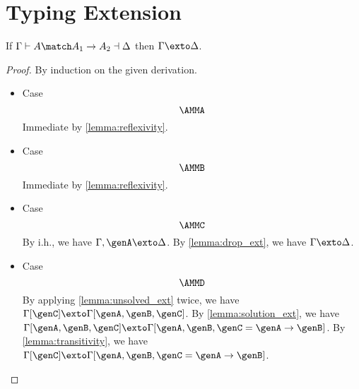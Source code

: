 \section{Typing Extension}

\begin{mlemma}
  If $\Gamma \vdash A \match A_1 \to A_2 \dashv \Delta$ then $\Gamma \exto \Delta$.
  \label{lemma:match_extension}
\end{mlemma}
\begin{proof}
  By induction on the given derivation.
  \begin{itemize}
  \item Case \[\AMMA \] Immediate by \cref{lemma:reflexivity}.
  \item Case \[\AMMB\] Immediate by \cref{lemma:reflexivity}.
  \item Case \[\AMMC\] By i.h., we have $\Gamma, \genA \exto \Delta$. By
    \cref{lemma:drop_ext}, we have $\Gamma \exto \Delta$.
  \item Case \[\AMMD\] By applying \cref{lemma:unsolved_ext} twice, we have
    $\Gamma[\genC] \exto \Gamma[\genA, \genB, \genC]$. By
    \cref{lemma:solution_ext}, we have $\Gamma[\genA, \genB, \genC] \exto
    \Gamma[\genA, \genB, \genC = \genA \to \genB]$. By
    \cref{lemma:transitivity}, we have $\Gamma[\genC] \exto \Gamma[\genA,
    \genB, \genC = \genA \to \genB]$.
  \end{itemize}

\end{proof}

